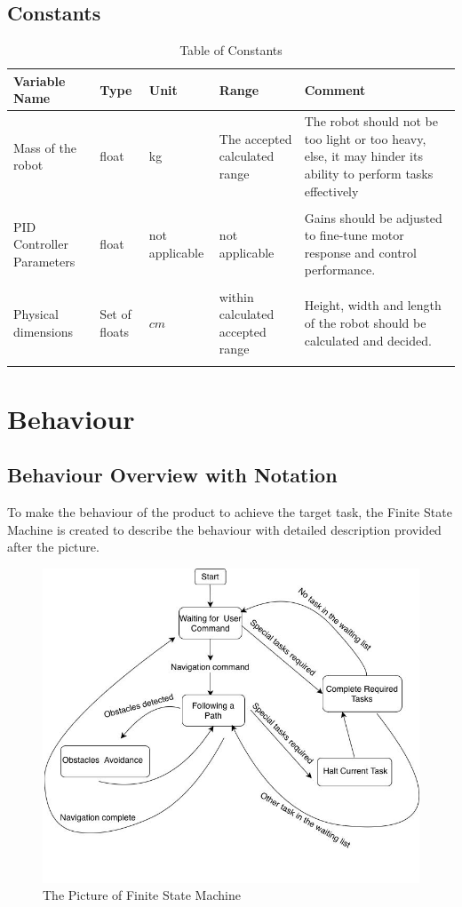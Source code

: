 \documentclass[12pt]{article}
\begin{document}
\subsection{Constants}
\begin{table}[H]
\caption{Table of Constants} 
\begin{tabularx}{\textwidth}{XXXXX}
\toprule
\textbf{Variable Name} & \textbf{Type} & \textbf{Unit} & \textbf{Range} & \textbf{Comment} \\
\midrule
Mass of the robot& float& kg & The accepted calculated range & The robot should not be too light or too heavy, else, it may hinder its ability to perform tasks effectively\\\\
PID Controller Parameters& float& not applicable & not applicable& Gains should be adjusted to fine-tune motor response and control performance.\\\\
Physical dimensions& Set of floats & $cm$& within calculated accepted range& Height, width and length of the robot should be calculated and decided.
\\\\

\bottomrule
\end{tabularx}
\end{table}


\section{Behaviour}
\subsection{Behaviour Overview with Notation}
To make the behaviour of the product to achieve the target task, the Finite State Machine is created to describe the behaviour with detailed description provided after the picture. 
\begin{figure}[H]
    \centering
    \includegraphics[scale=0.6]{FSM.jpg}
    \caption{The Picture of Finite  State Machine}
\end{figure}
\end{document}
